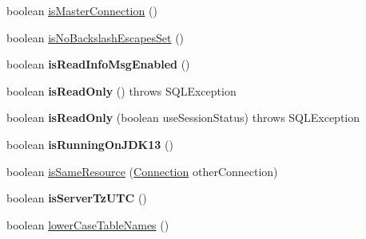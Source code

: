 \begin{DoxyCompactItemize}
\item 
boolean \mbox{\hyperlink{classcom_1_1mysql_1_1jdbc_1_1_multi_host_my_s_q_l_connection_a63f3a1689c557f644de8accf62405885}{is\+Master\+Connection}} ()
\item 
boolean \mbox{\hyperlink{classcom_1_1mysql_1_1jdbc_1_1_multi_host_my_s_q_l_connection_a9647bf20f66e69d8a07a2f867957f7f2}{is\+No\+Backslash\+Escapes\+Set}} ()
\item 
\mbox{\label{classcom_1_1mysql_1_1jdbc_1_1_multi_host_my_s_q_l_connection_aebd6a04c36ccb5bc47009a2f33eb693e}} 
boolean {\bfseries is\+Read\+Info\+Msg\+Enabled} ()
\item 
\mbox{\label{classcom_1_1mysql_1_1jdbc_1_1_multi_host_my_s_q_l_connection_a17d90e7db2c263c56a676a77860a6c36}} 
boolean {\bfseries is\+Read\+Only} ()  throws S\+Q\+L\+Exception 
\item 
\mbox{\label{classcom_1_1mysql_1_1jdbc_1_1_multi_host_my_s_q_l_connection_a541dd7b008d200f765f0c172edb9ef66}} 
boolean {\bfseries is\+Read\+Only} (boolean use\+Session\+Status)  throws S\+Q\+L\+Exception 
\item 
\mbox{\label{classcom_1_1mysql_1_1jdbc_1_1_multi_host_my_s_q_l_connection_a85b4559c116e71b31538a112e568dab8}} 
boolean {\bfseries is\+Running\+On\+J\+D\+K13} ()
\item 
boolean \mbox{\hyperlink{classcom_1_1mysql_1_1jdbc_1_1_multi_host_my_s_q_l_connection_a476b5999b12b909b4b43cd3c97b4f5d5}{is\+Same\+Resource}} (\mbox{\hyperlink{interfacecom_1_1mysql_1_1jdbc_1_1_connection}{Connection}} other\+Connection)
\item 
\mbox{\label{classcom_1_1mysql_1_1jdbc_1_1_multi_host_my_s_q_l_connection_a59950c26e86e2dfb50d4fbc59a094999}} 
boolean {\bfseries is\+Server\+Tz\+U\+TC} ()
\item 
boolean \mbox{\hyperlink{classcom_1_1mysql_1_1jdbc_1_1_multi_host_my_s_q_l_connection_a0d35ab03e1820d4895d11f35d7b9a9ac}{lower\+Case\+Table\+Names}} ()
\item 
\mbox{\label{classcom_1_1mysql_1_1jdbc_1_1_multi_host_my_s_q_l_connection_ab46dd4f16ce39765ffaba16be6495598}} 

\end{DoxyCompactItemize}
